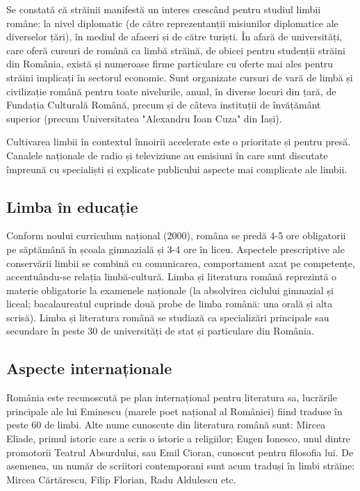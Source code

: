 \documentclass[]{../../metanetpaper}
\begin{document}
\begin{multicols}{2}
Se constată că străinii manifestă un interes crescând pentru studiul limbii române: la nivel diplomatic (de către reprezentanții misiunilor diplomatice ale diverselor țări), în mediul de afaceri și de către turiști. În afară de universități, care oferă cursuri de română ca limbă străină, de obicei pentru studenții străini din România, există și numeroase firme particulare cu oferte mai ales pentru străini implicați în sectorul economic. Sunt organizate cursuri de vară de limbă și civilizație română pentru toate nivelurile, anual, în diverse locuri din țară, de Fundația Culturală Română, precum și de câteva instituții de învățământ superior (precum Universitatea "Alexandru Ioan Cuza" din Iași).

Cultivarea limbii în contextul înnoirii accelerate este o prioritate și pentru presă. Canalele naționale de radio și televiziune au emisiuni în care sunt discutate împreună cu specialiști și explicate publicului aspecte mai complicate ale limbii.

\subsection{Limba în educație}

Conform noului curriculum național (2000), româna se predă 4-5 ore obligatorii pe săptămână în școala gimnazială și 3-4 ore în liceu. Aspectele prescriptive ale conservării limbii se combină cu comunicarea, comportament axat pe competențe, accentuându-se relația limbă-cultură. Limba și literatura română reprezintă o materie obligatorie la examenele naționale (la absolvirea ciclului gimnazial și liceal; bacalaureatul cuprinde două probe de limba română: una orală și alta scrisă).
Limba și literatura română se studiază ca specializări principale sau secundare în peste 30 de universități de stat și particulare din România.

\subsection{Aspecte internaționale}

România este recunoscută pe plan internațional pentru literatura sa, lucrările principale ale lui Eminescu (marele poet național al României) fiind traduse în peste 60 de limbi. Alte nume cunoscute din literatura română sunt: Mircea Eliade, primul istoric care a scris o istorie a religiilor; Eugen Ionesco, unul dintre promotorii Teatrul Absurdului, sau Emil Cioran, cunoscut pentru filosofia lui. De asemenea, un număr de scriitori contemporani sunt acum traduși în limbi străine: Mircea Cărtărescu, Filip Florian, Radu Aldulescu etc.


\end{multicols}
\end{document}
